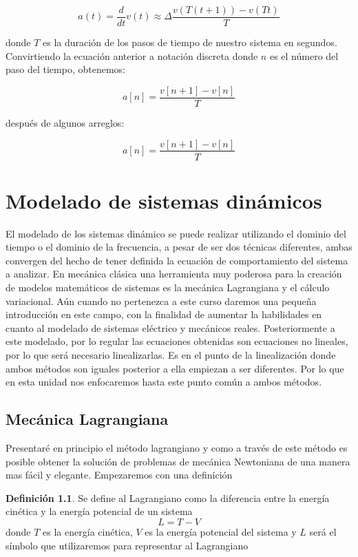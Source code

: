 \documentclass[12pt]{book}
\theoremstyle{definition}
\newtheorem{dfn}{Definición}[section]
\theoremstyle{remark}
\theoremstyle{plain}
\begin{document}
\begin{equation}
\label{equ802}
a(t) = \frac{d}{dt}v(t) \approx  \Delta \frac{v(T(t+1))-v(Tt)}{T}
\end{equation}


donde $T$ es la duración de los pasos de tiempo de nuestro sistema en segundos. Convirtiendo la ecuación anterior a notación discreta donde $n$ es el número del paso del tiempo, obtenemos:

\begin{equation}
\label{equ802}
a[n] = \frac{v[n+1]-v[n]}{T}
\end{equation}

después de algunos arreglos:

\begin{equation}
\label{equ802}
a[n] = \frac{v[n+1]-v[n]}{T}
\end{equation}

\chapter{Modelado de sistemas dinámicos}

El modelado de los sistemas dinámico se puede realizar utilizando el dominio del tiempo o el dominio de la frecuencia, a pesar de ser dos técnicas diferentes, ambas 
convergen del hecho de tener definida la ecuación de comportamiento del sistema a analizar. En mecánica clásica una herramienta muy poderosa para la creación de modelos 
matemáticos de sistemas es la mecánica Lagrangiana y el cálculo variacional. Aún cuando no pertenezca a este curso daremos una pequeña introducción en este campo, 
con la finalidad de aumentar la habilidades en cuanto al modelado de sistemas eléctrico y mecánicos reales. Posteriormente a este modelado, por lo regular las ecuaciones 
obtenidas son ecuaciones no lineales, por lo que será necesario linealizarlas. Es en el punto de la linealización donde ambos métodos son iguales posterior a ella 
empiezan a ser diferentes. Por lo que en esta unidad nos enfocaremos hasta este punto común a ambos métodos.

\section{Mecánica Lagrangiana}
Presentaré en principio el método lagrangiano y como a través de este método es posible obtener la solución de problemas de mecánica Newtoniana de una manera mas fácil y elegante. Empezaremos con una definición

\begin{dfn}
\label{def2}
Se define al Lagrangiano como la diferencia entre la energía cinética y la energía potencial de un sistema
\begin{equation*}
L=T-V
\end{equation*}
donde $T$ es la energía cinética, $V$ es la energía potencial del sistema y $L$ será el símbolo que utilizaremos para representar al Lagrangiano
\end{dfn}
\end{document}
